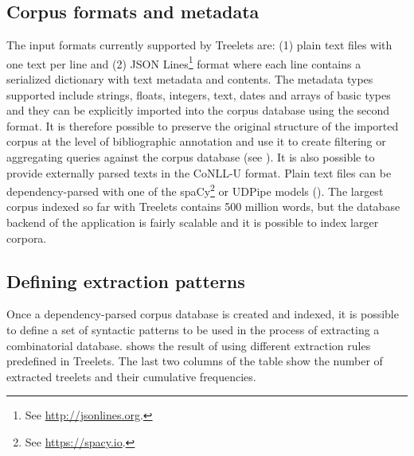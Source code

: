 \documentclass[output=paper]{langscibook}
\begin{document}
\subsection{Corpus formats and metadata}

The input formats currently supported by Treelets are: (1) plain text files with one text per line and (2) JSON Lines\footnote{See \url{http://jsonlines.org}.} format where each line contains a serialized dictionary with text metadata and contents. The metadata types supported include strings, floats, integers, text, dates and arrays of basic types and they can be explicitly imported into the corpus database using the second format. It is therefore possible to preserve the original structure of the imported corpus at the level of bibliographic annotation and use it to create filtering or aggregating queries against the corpus database (see ). It is also possible to provide externally parsed texts in the CoNLL-U format. Plain text files can be dependency-parsed with one of the spaCy\footnote{See \url{https://spacy.io}.} or UDPipe models (\citealt{StrakaStraková2017}). The largest corpus indexed so far with Treelets contains 500 million words, but the database backend of the application is fairly scalable and it is possible to index larger corpora.

\subsection{Defining extraction patterns}\label{sec:pezik:3.2}

Once a dependency-parsed corpus database is created and indexed, it is possible to define a set of syntactic patterns to be used in the process of extracting a combinatorial database.  shows the result of using different extraction rules predefined in Treelets. The last two columns of the table show the number of extracted treelets and their cumulative frequencies. 
\end{document}
